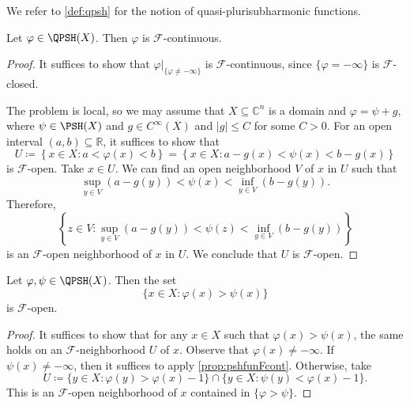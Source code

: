 We refer to \cref{def:qpsh} for the notion of quasi-plurisubharmonic functions.
\begin{proposition}\label{prop:pshfunFcont}
    Let $\varphi\in \QPSH(X)$. Then $\varphi$ is $\mathcal{F}$-continuous.
\end{proposition}
\begin{proof}
    It suffices to show that $\varphi|_{\{\varphi\neq -\infty\}}$ is $\mathcal{F}$-continuous, since $\{\varphi=-\infty\}$ is $\mathcal{F}$-closed.

    The problem is local, so we may assume that $X\subseteq \mathbb{C}^n$ is a domain and $\varphi=\psi+g$, where $\psi\in \PSH(X)$ and $g\in C^{\infty}(X)$ and $|g|\leq C$ for some $C>0$. For an open interval $(a,b)\subseteq \mathbb{R}$, it suffices to show that
    \[
        U\coloneqq \left\{ x\in X:a<\varphi(x)<b\right\}=\left\{ x\in X:a-g(x)<\psi(x)<b-g(x)\right\}
    \]
    is $\mathcal{F}$-open. Take $x\in U$. We can find an open neighborhood $V$ of $x$ in $U$ such that
    \[
    \sup_{y\in V} \left( a-g(y)\right)<\psi(x)< \inf_{y\in V} \left( b-g(y) \right).
    \]
    Therefore,
    \[
    \left\{z\in V:\sup_{y\in V} \left(a-g(y)\right)<\psi(z)<\inf_{y\in V} \left(b-g(y)\right)\right\}
    \]
    is an $\mathcal{F}$-open neighborhood of $x$ in $U$. We conclude that $U$ is $\mathcal{F}$-open.
\end{proof}

\begin{corollary}\label{cor:diffpshFopen}
    Let $\varphi,\psi\in \QPSH(X)$. Then the set
    \[
    \{x\in X: \varphi(x)>\psi(x)\}
    \]
    is $\mathcal{F}$-open.
\end{corollary}
\begin{proof}
    It suffices to show that for any $x\in X$ such that $\varphi(x)>\psi(x)$, the same holds on an $\mathcal{F}$-neighborhood $U$ of $x$. Observe that $\varphi(x)\neq -\infty$.
    If $\psi(x)\neq -\infty$, then it suffices to apply \cref{prop:pshfunFcont}. Otherwise, take
    \[
    U\coloneqq \{y\in X: \varphi(y)>\varphi(x)-1\}\cap \{y\in X: \psi(y)<\varphi(x)-1\}.
    \]
    This is an $\mathcal{F}$-open neighborhood of $x$ contained in $\{\varphi>\psi\}$.
\end{proof}

